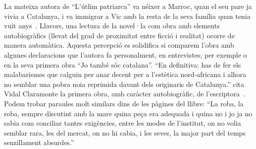 La mateixa autora de ``L'útlim patriarca'' va néixer a Marroc, quan el seu pare ja vivia a Catalunya, i va immigrar a Vic amb la resta de la seva família quan tenia vuit anys~\autocite{Vidal2012}.
Llavors, una lectura de la novel·la com obra amb elements autobiogràfics (llevat del grad de proximitat entre ficció i realitat) ocorre de manera automàtica.
Aquesta percepció es solidifica si comparem l'obra amb algunes declaracions que l'autora fa personalment, en entrevistes, per exemple o en la seva primera obra ``Jo també sóc catalana''.
``En definitiva: has de fer els malabarismes que calguin per anar decent per a l’estètica nord-africana i alhora no semblar una pobra noia reprimida davant dels originaris de Catalunya.'' cita Vidal Claramonte la primera obra, amb caràcter autobiogràfic, de l'escriptora~\autocite{Vidal2012}.
Podem trobar paraules molt similars dins de les pàgines del llibre:
``La roba, la roba, sempre discutint amb la mare quina peça era adequada i quina no i jo ja no sabia com conciliar tantes exigències, entre les modes de l'institut, on no volia semblar rara, les del mercat, on no hi cabia, i les seves, la major part del temps senzillament absurdes.''~\autocite[285]{ElHachmi2008}


